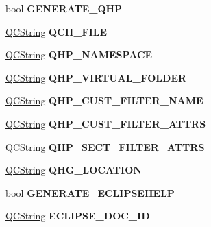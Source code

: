 \begin{DoxyCompactItemize}
bool {\bfseries G\+E\+N\+E\+R\+A\+T\+E\+\_\+\+Q\+HP}
\item 
\mbox{\label{class_config_values_a2e374180fad8cc68771d2454ed34339b}} 
\mbox{\hyperlink{class_q_c_string}{Q\+C\+String}} {\bfseries Q\+C\+H\+\_\+\+F\+I\+LE}
\item 
\mbox{\label{class_config_values_aec0aa775be6c970ee28eda81eb4132f7}} 
\mbox{\hyperlink{class_q_c_string}{Q\+C\+String}} {\bfseries Q\+H\+P\+\_\+\+N\+A\+M\+E\+S\+P\+A\+CE}
\item 
\mbox{\label{class_config_values_ad6de16aa62fca3977e357359588db210}} 
\mbox{\hyperlink{class_q_c_string}{Q\+C\+String}} {\bfseries Q\+H\+P\+\_\+\+V\+I\+R\+T\+U\+A\+L\+\_\+\+F\+O\+L\+D\+ER}
\item 
\mbox{\label{class_config_values_a2d7911a65b67d916815c8f888fb51501}} 
\mbox{\hyperlink{class_q_c_string}{Q\+C\+String}} {\bfseries Q\+H\+P\+\_\+\+C\+U\+S\+T\+\_\+\+F\+I\+L\+T\+E\+R\+\_\+\+N\+A\+ME}
\item 
\mbox{\label{class_config_values_a7ae6334b93520a61a299aa9389a0a86e}} 
\mbox{\hyperlink{class_q_c_string}{Q\+C\+String}} {\bfseries Q\+H\+P\+\_\+\+C\+U\+S\+T\+\_\+\+F\+I\+L\+T\+E\+R\+\_\+\+A\+T\+T\+RS}
\item 
\mbox{\label{class_config_values_aaa06e4a0fd64479a309ab84371389b09}} 
\mbox{\hyperlink{class_q_c_string}{Q\+C\+String}} {\bfseries Q\+H\+P\+\_\+\+S\+E\+C\+T\+\_\+\+F\+I\+L\+T\+E\+R\+\_\+\+A\+T\+T\+RS}
\item 
\mbox{\label{class_config_values_a083c02d06f01b65ab1265d046a03bd91}} 
\mbox{\hyperlink{class_q_c_string}{Q\+C\+String}} {\bfseries Q\+H\+G\+\_\+\+L\+O\+C\+A\+T\+I\+ON}
\item 
\mbox{\label{class_config_values_a03227653575fda394dd54b42b67fabc5}} 
bool {\bfseries G\+E\+N\+E\+R\+A\+T\+E\+\_\+\+E\+C\+L\+I\+P\+S\+E\+H\+E\+LP}
\item 
\mbox{\label{class_config_values_a0eeb2fb01346f4941be40e190492be46}} 
\mbox{\hyperlink{class_q_c_string}{Q\+C\+String}} {\bfseries E\+C\+L\+I\+P\+S\+E\+\_\+\+D\+O\+C\+\_\+\+ID}

\end{DoxyCompactItemize}
